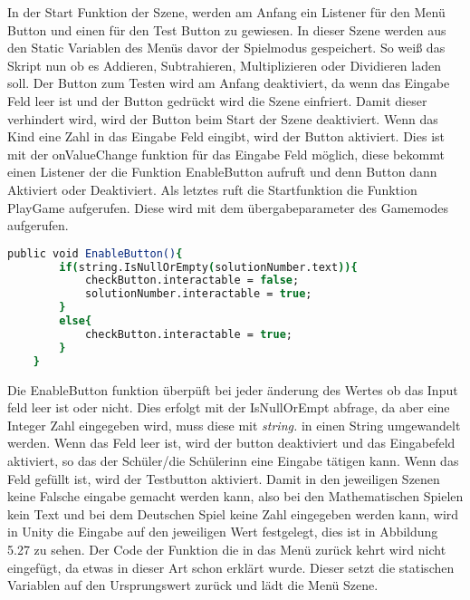 In der Start Funktion der Szene, werden am Anfang ein Listener für den Menü Button und einen für den Test Button zu gewiesen. In dieser Szene werden aus den Static Variablen des Menüs davor der Spielmodus gespeichert. So weiß das Skript nun ob es Addieren, Subtrahieren, Multiplizieren oder Dividieren laden soll. Der Button zum Testen wird am Anfang deaktiviert, da wenn das Eingabe Feld leer ist und der Button gedrückt wird die Szene einfriert. Damit dieser verhindert wird, wird der Button beim Start der Szene deaktiviert. Wenn das Kind eine Zahl in das Eingabe Feld eingibt, wird der Button aktiviert. Dies ist mit der onValueChange funktion für das Eingabe Feld möglich, diese bekommt einen Listener der die Funktion EnableButton aufruft und denn Button dann Aktiviert oder Deaktiviert. Als letztes ruft die Startfunktion die Funktion PlayGame aufgerufen. Diese wird mit dem übergabeparameter des Gamemodes aufgerufen.\\
\begin{lstlisting}[language=csh, caption={MathOperations.cs EnableButton Funktion}]
	public void EnableButton(){
		if(string.IsNullOrEmpty(solutionNumber.text)){
			checkButton.interactable = false;
			solutionNumber.interactable = true;
		}
		else{
			checkButton.interactable = true;
		}
	}
\end{lstlisting}
Die EnableButton funktion überpüft bei jeder änderung des Wertes ob das Input feld leer ist oder nicht. Dies erfolgt mit der IsNullOrEmpt abfrage, da aber eine Integer Zahl eingegeben wird, muss diese mit \textit{string.} in einen String umgewandelt werden. Wenn das Feld leer ist, wird der button deaktiviert und das Eingabefeld aktiviert, so das der Schüler/die Schülerinn eine Eingabe tätigen kann. Wenn das Feld gefüllt ist, wird der Testbutton aktiviert. Damit in den jeweiligen Szenen keine Falsche eingabe gemacht werden kann, also bei den Mathematischen Spielen kein Text und bei dem Deutschen Spiel keine Zahl eingegeben werden kann, wird in Unity die Eingabe auf den jeweiligen Wert festgelegt, dies ist in Abbildung 5.27 zu sehen.
Der Code der Funktion die in das Menü zurück kehrt wird nicht eingefügt, da etwas in dieser Art schon erklärt wurde. Dieser setzt die statischen Variablen auf den Ursprungswert zurück und lädt die Menü Szene.\\
